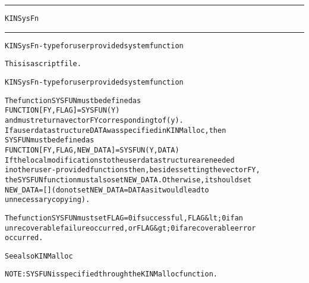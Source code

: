 \begin{samepage}
\hrule
\begin{center}
{\large \verb!KINSysFn!}
\label{p:KINSysFn}
\end{center}
\hrule\vspace{0.1in}



\begin{alltt}
KINSysFn - type for user provided system function
\end{alltt}

\end{samepage}



\begin{samepage}


\begin{alltt}
This is a script file. 
\end{alltt}

\end{samepage}



\begin{alltt}
KINSysFn - type for user provided system function

   The function SYSFUN must be defined as 
        FUNCTION [FY, FLAG] = SYSFUN(Y)
   and must return a vector FY corresponding to f(y).
   If a user data structure DATA was specified in KINMalloc, then
   SYSFUN must be defined as
        FUNCTION [FY, FLAG, NEW_DATA] = SYSFUN(Y,DATA)
   If the local modifications to the user data structure are needed 
   in other user-provided functions then, besides setting the vector FY,
   the SYSFUN function must also set NEW_DATA. Otherwise, it should set
   NEW_DATA=[] (do not set NEW_DATA = DATA as it would lead to
   unnecessary copying).

   The function SYSFUN must set FLAG=0 if successful, FLAG&lt;0 if an
   unrecoverable failure occurred, or FLAG&gt;0 if a recoverable error
   occurred.

   See also KINMalloc

   NOTE: SYSFUN is specified through the KINMalloc function.
\end{alltt}






\vspace{0.1in}